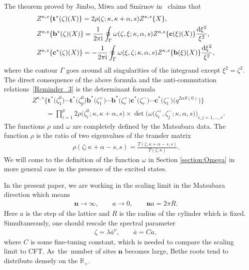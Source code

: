 \documentclass[pdftex]{sigma}
\numberwithin{equation}{section}
\begin{document}
The theorem proved by Jimbo, Miwa and Smirnov in~\cite{HGS_3} claims that
\begin{align*}%
&Z^{\kappa, s} \lbrace \mathbf{t}^{*}(\zeta)(X) \rbrace
 = 2\rho(\zeta; \kappa, \kappa+\alpha, s) Z^{\kappa, s}\lbrace X \rbrace, \\
&Z^{\kappa, s} \lbrace \mathbf{b}^{*}(\zeta)(X) \rbrace
 = \frac{1}{2\pi {\rm i}} \oint_\Gamma \omega(\zeta, \xi; \kappa, \alpha, s) Z^{\kappa, s} \lbrace\mathbf{c}(\xi)(X)\rbrace\frac{{\rm d}\xi^2}{\xi^2}, \\
&Z^{\kappa, s} \lbrace \mathbf{c}^{*}(\zeta)(X) \rbrace
 = -\frac{1}{2\pi {\rm i}} \oint_\Gamma \omega(\xi, \zeta; \kappa, \alpha, s) Z^{\kappa, s} \lbrace\mathbf{b}(\xi)(X)\rbrace\frac{{\rm d}\xi^2}{\xi^2} \nonumber,
\end{align*}
where the contour $\Gamma$ goes around all singularities of the integrand except $\xi^2=\zeta^2$. The direct consequence of the above formula and the anti-commutation relations~\eqref{Reminder_3} is the determinant formula
\begin{align}
&Z^{\kappa, s}\bigl\lbrace \mathbf{t}^{*}\bigl(\zeta^0_1\bigr) \cdots \mathbf{t}^{*}\bigl(\zeta^0_p\bigr)
                      \mathbf{b}^{*}\bigl(\zeta^+_1\bigr) \cdots \mathbf{b}^{*}\bigl(\zeta^+_r\bigr)
                      \mathbf{c}^{*}\bigl(\zeta^-_r\bigr) \cdots \mathbf{c}^{*}\bigl(\zeta^-_1\bigr)
                      \bigl(q^{2\alpha S(0)}\bigr)
              \bigr\rbrace \nonumber\\
&\qquad{}=\prod_{i=1}^{p} 2\rho\bigl(\zeta^0_i; \kappa, \kappa+\alpha, s\bigr) \times \det\bigl(\omega\bigl(\zeta^+_i, \zeta^-_j; \kappa, \alpha, s\bigr)\bigr)_{i, j=1, \dots, r}.\label{Reminder_JMS_Det}
\end{align}
The functions $\rho$ and $\omega$ are completely defined by the Matsubara data. The function $\rho$ is the ratio of two eigenvalues of the transfer matrix
\begin{align*}
\rho(\zeta; \kappa+\alpha-s, s)=\frac{T(\zeta, \kappa+\alpha-s, s)}{T(\zeta, \kappa)}.
\end{align*}
We will come to the definition of the function $\omega$ in Section \ref{section:Omega} in more general case in the presence of the excited states.

In the present paper, we are working in the scaling limit in the Matsubara direction which means
\begin{align*}
\textbf{n}\rightarrow\infty,
\qquad
a\rightarrow 0,
\qquad
\textbf{n}a=2\pi R.
\end{align*}
Here $a$ is the step of the lattice and $R$ is the radius of the cylinder which is fixed. Simultaneously, one should rescale the spectral parameter
\begin{align*}
\zeta=\lambda\bar{a}^\nu,
\qquad
\bar{a}=Ca,
\end{align*}
where $C$ is some fine-tuning constant, which is needed to compare the scaling limit to CFT. As~the~number of sites $\textbf{n}$ becomes large, Bethe roots tend to distribute densely on the $\mathbb{R}_+$.
\end{document}
